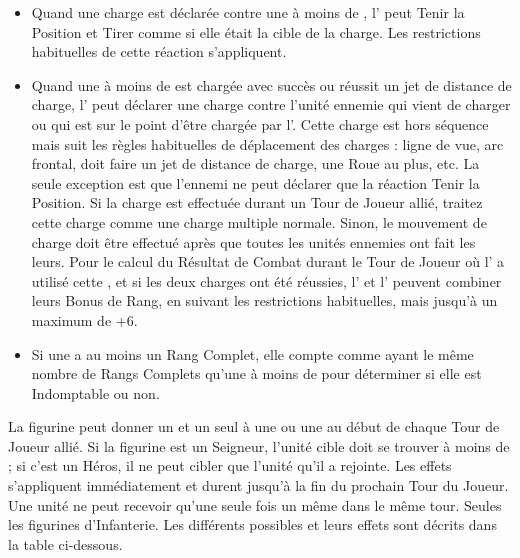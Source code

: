 \begin{itemize}[label={-}]

\item Quand une charge est déclarée contre une \parentunit{} à moins de , l'\supportunit{} peut Tenir la Position et Tirer comme si elle était la cible de la charge. Les restrictions habituelles de cette réaction s'appliquent.

\item Quand une \parentunit{} à moins de  est chargée avec succès ou réussit un jet de distance de charge, l'\supportunit{} peut déclarer une charge contre l'unité ennemie qui vient de charger ou qui est sur le point d'être chargée par l'\parentunit{}. Cette charge est hors séquence mais suit les règles habituelles de déplacement des charges : ligne de vue, arc frontal, doit faire un jet de distance de charge, une Roue au plus, etc. La seule exception est que l'ennemi ne peut déclarer que la réaction Tenir la Position. Si la charge est effectuée durant un Tour de Joueur allié, traitez cette charge comme une charge multiple normale. Sinon, le mouvement de charge doit être effectué après que toutes les unités ennemies ont fait les leurs. Pour le calcul du Résultat de Combat durant le Tour de Joueur où l'\supportunit{} a utilisé cette \supportingaction{}, et si les deux charges ont été réussies, l'\supportunit{} et l'\parentunit{} peuvent combiner leurs Bonus de Rang, en suivant les restrictions habituelles, mais jusqu'à un maximum de +6.

\item Si une \supportunit{} a au moins un Rang Complet, elle compte comme ayant le même nombre de Rangs Complets qu'une \parentunit{} à moins de  pour déterminer si elle est Indomptable ou non.

\end{itemize}

\armyspecialruleentry{\orders}

La figurine peut donner un et un seul \order{} à une \parentunit{} ou une \supportunit{} au début de chaque Tour de Joueur allié. Si la figurine est un Seigneur, l'unité cible doit se trouver à moins de  ; si c'est un Héros, il ne peut cibler que l'unité qu'il a rejointe. Les effets s'appliquent immédiatement et durent jusqu'à la fin du prochain Tour du Joueur. Une unité ne peut recevoir qu'une seule fois un même \order{} dans le même tour. Seules les figurines d'Infanterie. Les différents \orders{} possibles et leurs effets sont décrits dans la table ci-dessous.

